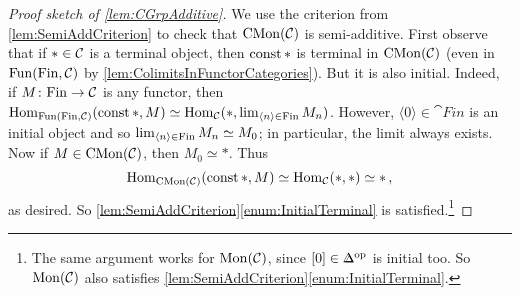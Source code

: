 \begin{proof}[Proof sketch of \cref{lem:CGrpAdditive}]
	We use the criterion from \cref{lem:SemiAddCriterion} to check that $\mathrm{CMon}(\mathcal{C})$ is semi-additive. First observe that if $*\in\mathcal{C}$ is a terminal object, then $\operatorname{const} *$ is terminal in $\mathrm{CMon}(\mathcal{C})$ (even in $\operatorname{Fun}(\mathrm{Fin},\mathcal{C})$ by \cref{lem:ColimitsInFunctorCategories}). But it is also initial. Indeed, if $M\colon \mathrm{Fin}\rightarrow\mathcal{C}$ is any functor, then $\operatorname{Hom}_{\mathrm{Fun}(\mathrm{Fin},\mathcal{C})}(\operatorname{const} *,M)\simeq \operatorname{Hom}_{\mathcal{C}}(*,\operatorname*{lim}_{\langle n\rangle\in\mathrm{Fin}} M_n)$. However, $\langle 0\rangle \in\cat{Fin}$ is an initial object and so $\operatorname*{lim}_{\langle n\rangle\in\mathrm{Fin}} M_n\simeq M_0$; in particular, the limit always exists. Now if $M\in \mathrm{CMon}(\mathcal{C})$, then $M_0\simeq *$. Thus
	\begin{equation*}
		\operatorname{Hom}_{\mathrm{CMon}(\mathcal{C})}(\operatorname{const} *,M)\simeq \operatorname{Hom}_{\mathcal{C}}(*,*)\simeq *\,,
	\end{equation*}
	as desired. So \cref{lem:SemiAddCriterion}\cref{enum:InitialTerminal} is satisfied.\footnote{The same argument works for $\mathrm{Mon}(\mathcal{C})$, since $[0]\in \IDelta^\op$ is initial too. So $\mathrm{Mon}(\mathcal{C})$ also satisfies \cref{lem:SemiAddCriterion}\cref{enum:InitialTerminal}.}
	

\end{proof}
